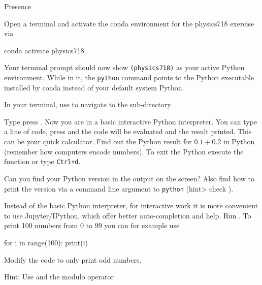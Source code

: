\documentclass[a4paper, draft=False]{scrartcl}
\begin{document}
\begin{exam}[Presence]{Presence}
\begin{instructions}
\begin{problem*}
      Open a terminal and activate the conda environment for the physics718
      exercise via

      \begin{bashcode}
        conda activate physics718
      \end{bashcode}

      Your terminal prompt should now show \texttt{(physics718)} as your active
      Python environment. While in it, the \texttt{python} command points to the
      Python executable installed by conda instead of your default system
      Python.

      In your terminal, use  to navigate to the sub-directory
      \begin{parts}
        \item Type  press \keys{\return}. Now you are in a basic
          interactive Python interpreter. You can type a line of code, press
          \keys{\return} and the code will be evaluated and the result printed.
          This can be your quick calculator. Find out the Python result for
          $0.1 + 0.2$ in Python (remember how computers encode numbers). To exit
          the Python execute the  function or type \texttt{Ctrl+d}.
        \item Can you find your Python version in the output on the screen? Also
          find how to print the version via a command line argument to
          \texttt{python} (hint> check ).
        \item Instead of the basic Python interpreter, for interactive work it
          is more convenient to use Jupyter/IPython, which offer better
          auto-completion and help. Run . To print 100
          numbers from 0 to 99 you can for example use
          \begin{pythoncode}
            for i in range(100):
                print(i)
          \end{pythoncode}

          Modify the code to only print odd numbers.

          Hint: Use  and
          the modulo operator \py{%
          interactively, e.g.\ type \py{9 %
          Also remember that 0's are treated as boolean \py{False} inside
          conditions while all other numbers are \py{True}, you can validate
          this with e.g.\ \py{print(bool(0))} and \py{print(bool(1))}.

}}
\end{parts}
\end{problem*}
\end{instructions}
\end{exam}
\end{document}
